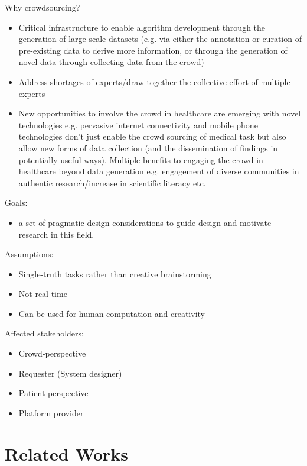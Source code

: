 \documentclass[10pt,twocolumn,letterpaper]{article}
\begin{document}
Why crowdsourcing?
\begin{itemize}
    \item Critical infrastructure to enable algorithm development through the generation of large scale datasets (e.g. via either the annotation or curation of pre-existing data to derive more information, or through the generation of novel data through collecting data from the crowd)
    \item Address shortages of experts/draw together the collective effort of multiple experts
    \item New opportunities to involve the crowd in healthcare are emerging with novel technologies e.g. pervasive internet connectivity and mobile phone technologies don't just enable the crowd sourcing of medical task but also allow new forms of data collection (and the dissemination of findings in potentially useful ways). Multiple benefits to engaging the crowd in healthcare beyond data generation e.g. engagement of diverse communities in authentic research/increase in scientific literacy etc.
\end{itemize}

Goals:
\begin{itemize}
    \item a set of pragmatic design considerations to guide design and motivate research in this field.
\end{itemize} 

Assumptions:
\begin{itemize}
    \item Single-truth tasks rather than creative brainstorming
    \item Not real-time
    \item Can be used for human computation and creativity
\end{itemize} 

Affected stakeholders:
\begin{itemize}
    \item Crowd-perspective
    \item Requester (System designer)
    \item Patient perspective
    \item Platform provider
\end{itemize}

\section{Related Works}
\end{document}
